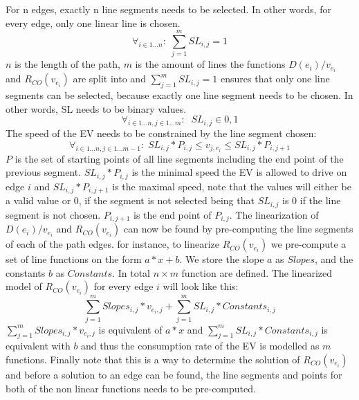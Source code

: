 For n edges, exactly n line segments needs to be selected. In other words, for every edge, only one linear line is chosen. 
\begin{equation*}
\forall_{i\in1 \dots n }:\; \sum_{j=1}^{m} SL_{i,j} = 1
\end{equation*}
$n$ is the length of the path, $m$ is the amount of lines the functions \( D(e_i)/v_{e_i} \) and $R_{CO}(v_{e_i})$ are split into and $\sum_{j=1}^{m} SL_{i,j} = 1$ ensures that only one line segments can be selected, because exactly one line segment needs to be chosen. In other words, SL needs to be binary values.
\begin{equation*}
\forall_{i\in1 \dots n, j \in 1 \dots m}: \; \; SL_{i,j} \in{0,1} 
\end{equation*}
The speed of the EV needs to be constrained by the line segment chosen:
\begin{equation*}
\forall_{i\in1 \dots n, j \in 1 \dots m-1}:\; SL_{i,j} * P_{i,j}  \le  v_{j,e_i} \le SL_{i,j}*P_{i,j+1}
\end{equation*}
$P$ is the set of starting points of all line segments including the end point of the previous segment. $SL_{i,j} * P_{i,j}$ is the minimal speed the EV is allowed to drive on edge $i$ and $SL_{i,j}*P_{i,j+1}$ is the maximal speed, note that the values will either be a valid value or $0$, if the segment is not selected being that $SL_{i,j}$ is $0$ if the line segment is not chosen. $P_{i,j+1}$ is the end point of $P_{i,j}$. 
The linearization of \( D(e_i)/v_{e_i} \) and $R_{CO}(v_{e_i})$ can now be found by pre-computing the line segments of each of the path edges. for instance, to linearize $R_{CO}(v_{e_i})$ we pre-compute a set of line functions on the form $a*x+b$. We store the slope $a$ as $Slopes$, and the constants $b$ as $Constants$. In total $n \times m$ function are defined. The linearized model of $R_{CO}(v_{e_i})$ for every edge $i$ will look like this:
\begin{equation*}
\sum_{j=1}^{m} Slopes_{i,j}*v_{e_i,j} + \sum_{j=1}^{m} SL_{i,j}*Constants_{i,j} 
\end{equation*}
$\sum_{j=1}^{m} Slopes_{i,j}*v_{e_i,j}$ is equivalent of $a*x$ and $\sum_{j=1}^{m} SL_{i,j}*Constants_{i,j}$ is equivalent with $b$ and thus the consumption rate of the EV is modelled as $m$ functions. 
Finally note that this is a way to determine the solution of $R_{CO}(v_{e_i})$ and before a solution to an edge can be found, the line segments and points for both of the non linear functions needs to be pre-computed. 
